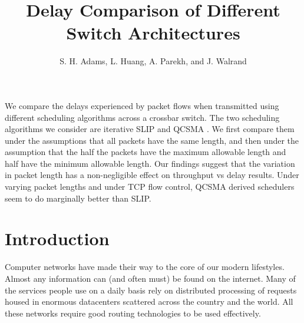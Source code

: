 \documentclass[11pt]{article}%
\begin{document}
\title{Delay Comparison of Different Switch Architectures}



\author{S. H. Adams, L. Huang, A. Parekh, and J. Walrand }%






\maketitle

{\abstract
 We compare the delays experienced by packet flows when transmitted using different scheduling algorithms across a crossbar switch.  The two scheduling algorithms we consider are iterative SLIP \cite{McKeown} and QCSMA \cite{Libin}.  We first compare them under the assumptions that all packets have the same length, and then under the assumption that the half the packets have the maximum allowable length and half have the minimum allowable length.  Our findings suggest that the variation in packet length has a non-negligible effect on throughput vs delay results.  Under varying packet lengths and under TCP flow control, QCSMA derived schedulers seem to do marginally better than SLIP.}

\section{Introduction}
Computer networks have made their way to the core of our modern lifestyles.  Almost any information can (and often must) be found on the internet.  Many of the services people use on a daily basis rely on distributed processing of requests housed in enormous datacenters scattered across the country and the world.  All these networks require good routing technologies to be used effectively.
\end{document}
